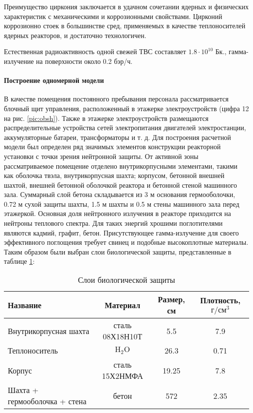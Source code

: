Преимущество циркония заключается в удачном сочетании ядерных и физических характеристик с механическими и коррозионными свойствами. Цирконий коррозионно стоек в большинстве сред, применяемых в качестве теплоносителей ядерных реакторов, и достаточно технологичен.

Естественная радиоактивность одной свежей ТВС составляет $1.8 \cdot 10^{10}$ Бк., гамма- излучение на поверхности около 0.2 бэр/ч.


\paragraph{Построение одномерной модели} В качестве помещения постоянного пребывания персонала рассматривается блочный щит управления, расположенный в этажерке электроустройств (цифра 12 на рис. \ref{pic:obsh}). Также в этажерке электроустройств размещаются распределительные устройства сетей электропитания двигателей электростанции, аккумуляторные батареи, трансформаторы и т. д.
Для построения расчетной модели был определен ряд значимых элементов конструкции реакторной установки с точки зрения нейтронной защиты. От активной зоны рассматриваемое помещение отделено внутрикорпусными элементами, такими как оболочка твэла, внутрикорпусная шахта; корпусом, бетонной внешней шахтой, внешней бетонной оболочкой реактора и бетонной стеной машинного зала. Суммарный слой бетона складывается из 3 м основания гермооболочки, 0.72 м сухой защиты шахты, 1.5 м шахты и 0.5 м стены машинного зала перед этажеркой.
Основная доля нейтронного излучения в реакторе приходится на нейтроны теплового спектра. Для таких энергий хрошими поглотителями являются кадмий, графит, бетон. 
Присутствующее гамма-излучение для своего эффективного поглощения требует свинец и подобные высокоплотные материалы. Таким образом были выбран слои биологической защиты, представленные в таблице \ref{tabular:bio-sec-layers}:

\begin{table}[H]
	\caption{Слои биологической защиты}
	\begin{center}
        \begin{tabular}{|l|c|c|c|}
        \toprule
         Название & Материал & Размер, см & Плотность, $\text{г}/\text{см}^3$ \\ 
         \midrule
         \hline
         Внутрикорпусная шахта & сталь 08Х18Н10Т & 5.5 & 7.9 \\
         \hline
         Теплоноситель & $\text{H}_2\text{O}$ & 26.3 & 0.71\\
         \hline
         Корпус & сталь 15Х2НМФА & 19.25 & 7.8 \\
         \hline
         Шахта + гермооболочка + стена & бетон & 572 & 2.35 \\
         \bottomrule
		\end{tabular}
		\label{tabular:bio-sec-layers}
	\end{center}
\end{table}

